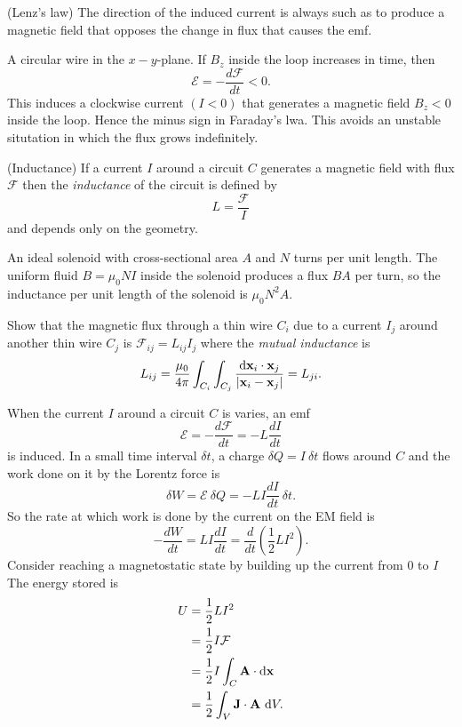 \documentclass{article}
\begin{document}
\begin{law}
	(Lenz's law) The direction of the induced current is always such as to produce a magnetic field that opposes the change in flux that causes the emf.
\end{law}
\begin{example}
  A circular wire in the $ x-y $-plane. If $ B_z $ inside the loop increases in time, then
  \[
	  \mathcal E = - \frac{d\mathcal F}{dt} < 0.
  \]
  This induces a clockwise current $ (I<0) $ that generates a magnetic field $ B_z< 0 $ inside the loop. Hence the minus sign in Faraday's lwa. This avoids an unstable situtation in which the flux grows indefinitely.
\end{example}
\begin{definition}
	(Inductance) If a current $ I $ around a circuit $ C $ generates a magnetic field with flux $ \mathcal F $ then the \textit{inductance} of the circuit is defined by
	\[
		L = \frac {\mathcal F}I
	\]
	and depends only on the geometry.
\end{definition}
\begin{example}
	An ideal solenoid with cross-sectional area $ A $ and $ N $ turns per unit length. The uniform fluid $ B= \mu_0 NI $ inside the solenoid produces a flux $ BA $ per turn, so the inductance per unit length of the solenoid is $ \mu_0 N^2 A $.
\end{example}
\begin{exercise}
	Show that the magnetic flux through a thin wire $ C_i $ due to a current $ I_j $ around another thin wire $ C_j $ is $ \mathcal F_{ij} = L_{ij}I_j $ where the \textit{mutual inductance} is
	\[
		L_{ij} = \frac{\mu_0}{4\pi} \int_{C_i}\int_{C_j}\frac{\mathrm d\mathbf{x}_i \cdot\mathrm {\mathbf{x}}_j}{|\mathbf{x}_i-\mathbf{x}_j|} = L_{ji}.
	\]
\end{exercise}
When the current $ I $ around a circuit $ C $ is varies, an emf
\[
	\mathcal E = - \frac{d\mathcal F}{dt} = -L\frac{dI}{dt}
\]
is induced. In a small time interval $ \delta t $, a charge $ \delta Q  = I\ \delta t $ flows around $ C $ and the work done on it by the Lorentz force is 
\[
	\delta W = \mathcal E \ \delta Q = -LI \frac{dI}{dt} \ \delta t.
\]
So the rate at which work is done by the current on the EM field is
\[
	-\frac{dW}{dt} = LI \frac{dI}{dt} = \frac d{dt} \left(\frac 12 LI^2\right).
\]
Consider reaching a magnetostatic state by building up the current from $ 0 $ to $ I $ The energy stored is
\begin{align*}
	U &= \frac 12 LI^2 \\
	  &= \frac 12 I\mathcal F \\
	  &= \frac 12 I\int_C \mathbf A \cdot\mathrm d \mathbf{x} \\
	  &= \frac 12 \int_V \mathbf J\cdot\mathbf A \ \mathrm dV.
\end{align*}
\end{document}
